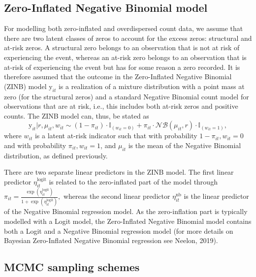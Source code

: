 \documentclass[a4paper, preprint, 3p,
authoryear]{elsarticle} %
\begin{document}
\subsection{Zero-Inflated Negative Binomial
model}\label{zero-inflated-negative-binomial-model}

For modelling both zero-inflated and overdispersed count data, we assume
that there are two latent classes of zeros to account for the excess
zeros: structural and at-risk zeros. A structural zero belongs to an
observation that is not at risk of experiencing the event, whereas an
at-risk zero belongs to an observation that is at-risk of experiencing
the event but has for some reason a zero recorded. It is therefore
assumed that the outcome in the Zero-Inflated Negative Binomial (ZINB)
model \(\text{y}_{it}\) is a realization of a mixture distribution with
a point mass at zero (for the structural zeros) and a standard Negative
Binomial count model for observations that are at risk, i.e., this
includes both at-risk zeros and positive counts. The ZINB model can,
thus, be stated as \begin{equation*}
 \text{y}_{it}|r,\mu_{it},w_{it} \sim (1-\pi_{it}) \cdot \mathbb{I}_{(w_{it} = 0)} + \pi_{it} \cdot \mathcal{NB}(\mu_{it},r) \cdot \mathbb{I}_{(w_{it}=1)},
\end{equation*} where \({w_{it}}\) is a latent at-risk indicator such
that with probability \({1-\pi_{it}, w_{it} = 0}\) and with probability
\({\pi_{it}, w_{it} = 1}\), and \({\mu_{it}}\) is the mean of the
Negative Binomial distribution, as defined previously.

There are two separate linear predictors in the ZINB model. The first
linear predictor \({\eta_{it}^{\text{logit}}}\) is related to the
zero-inflated part of the model through
\({\pi_{it} = \frac{\exp(\eta_{it}^{\text{logit}})}{1+\exp(\eta_{it}^{\text{logit}})},}\)
whereas the second linear predictor \({\eta_{it}^{\text{nb}}}\) is the
linear predictor of the Negative Binomial regression model. As the
zero-inflation part is typically modelled with a Logit model, the
Zero-Inflated Negative Binomial model contains both a Logit and a
Negative Binomial regression model (for more details on Bayesian
Zero-Inflated Negative Binomial regression see Neelon, 2019).

\subsection{MCMC sampling schemes}\label{mcmc-sampling-schemes}
\end{document}
